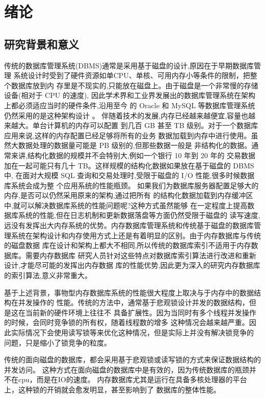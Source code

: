 
\chapter{绪论}

\section{研究背景和意义}

传统的数据库管理系统(DBMS)通常是采用基于磁盘的设计,原因在于早期数据库管理
系统设计时受到了硬件资源如单CPU、单核、可用内存小等条件的限制，把整个数据库放到内
存里是不现实的,只能放在磁盘上。由于磁盘是一个非常慢的存储设备(相对于 CPU 的速度),
因此学术界和工业界发展出的数据库管理系统在架构上都必须适应当时的硬件条件,沿用至今
的 Oracle 和 MySQL 等数据库管理系统仍然采用的是这种架构设计\cite{ailamaki1999dbmss}
\cite{ailamaki2002data}。
伴随着技术的发展,内存已经越来越便宜,容量也越来越大。单台计算机的内存可以配置
到几百 GB 甚至 TB 级别。对于一个数据库应用来说,这样的内存配置已经足够将所有的业务
数据加载到内存中进行使用。虽然大数据处理的数据量可能是 PB 级别的,但那些数据一般是
非结构化的数据。通常来讲,结构化数据的规模并不会特别大,例如一个银行 10 年到 20 年的
交易数据加在一起可能只有几十 TB。这样规模的结构化数据如果放在基于磁盘的 DBMS 中,
在面对大规模 SQL 查询和交易处理时,受限于磁盘的 I/O 性能,很多时候数据库系统会成为整
个应用系统的性能瓶颈。
如果我们为数据库服务器配置足够大的内存,是否可以仍然采用原来的架构,通过把所有
的结构化数据加载到内存缓冲区中,就可以解决数据库系统的性能问题呢?这种方式虽然能够
在一定程度上提高数据库系统的性能,但在日志机制和更新数据落盘等方面仍然受限于磁盘的
读写速度,远没有发挥出大内存系统的优势。内存数据库管理系统和传统基于磁盘的数据库管
理系统在架构设计和内存使用方式上还是有着明显的区别。由于内存数据库与传统的磁盘数据
库在设计和架构上都大不相同,所以传统的数据库索引不适用于内存数据库。需要内存数据库
研究人员针对这些特点对数据库索引算法进行改进和重新设计,才能尽可能的发挥出内存数据
库的性能优势,因此更为深入的研究内存数据库的索引算法,意义非常重大。

基于上述背景，事物型内存数据库系统的性能很大程度上取决与于内存中的数据结构在并发操作的
性能。传统的方法中，通常基于悲观锁设计并发的数据结构，但是这在当前新的硬件环境上往往不
具备扩展性。因为当同时有多个线程并发操作的时候，会同时竞争锁的所有权，随着线程数的增多
这种情况会越来越严重。因此实际情况下会使用读写锁等来优化这种情况，但是实际上并没有解决锁竞争的
问题，只是缩小了锁竞争的粒度。

传统的面向磁盘的数据库，都会采用基于悲观锁或读写锁的方式来保证数据结构的并发访问。
这种方式在面向磁盘的数据库中是有效的，因为传统数据库的瓶颈并不在cpu，而是在IO的速度。
内存数据库尤其是运行在具备多核处理器的平台上，这种锁的开销就会愈发明显，甚至影响到了
数据库的整体性能。

